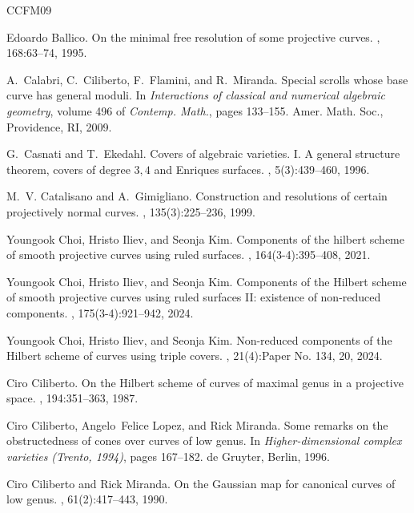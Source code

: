 \documentclass[a4paper,12pt]{amsart}
\begin{document}
\begin{thebibliography}{CCFM09}

Edoardo Ballico.
\newblock On the minimal free resolution of some projective curves.
, 168:63--74, 1995.

A.~Calabri, C.~Ciliberto, F.~Flamini, and R.~Miranda.
\newblock Special scrolls whose base curve has general moduli.
\newblock In {\em Interactions of classical and numerical algebraic geometry},
  volume 496 of {\em Contemp. Math.}, pages 133--155. Amer. Math. Soc.,
  Providence, RI, 2009.

G.~Casnati and T.~Ekedahl.
\newblock Covers of algebraic varieties. {I}. {A} general structure theorem,
  covers of degree {$3,4$} and {E}nriques surfaces.
, 5(3):439--460, 1996.

M.~V. Catalisano and A.~Gimigliano.
\newblock Construction and resolutions of certain projectively normal curves.
, 135(3):225--236, 1999.

Youngook {Choi}, Hristo {Iliev}, and Seonja {Kim}.
\newblock Components of the hilbert scheme of smooth projective curves using
  ruled surfaces.
, 164(3-4):395--408, 2021.

Youngook Choi, Hristo Iliev, and Seonja Kim.
\newblock Components of the {H}ilbert scheme of smooth projective curves using
  ruled surfaces {II}: existence of non-reduced components.
, 175(3-4):921--942, 2024.

Youngook Choi, Hristo Iliev, and Seonja Kim.
\newblock Non-reduced components of the {H}ilbert scheme of curves using triple
  covers.
, 21(4):Paper No. 134, 20, 2024.

Ciro Ciliberto.
\newblock On the {Hilbert} scheme of curves of maximal genus in a projective
  space.
, 194:351--363, 1987.

Ciro Ciliberto, Angelo~Felice Lopez, and Rick Miranda.
\newblock Some remarks on the obstructedness of cones over curves of low genus.
\newblock In {\em Higher-dimensional complex varieties ({T}rento, 1994)}, pages
  167--182. de Gruyter, Berlin, 1996.

Ciro Ciliberto and Rick Miranda.
\newblock On the {G}aussian map for canonical curves of low genus.
, 61(2):417--443, 1990.


\end{thebibliography}
\end{document}
